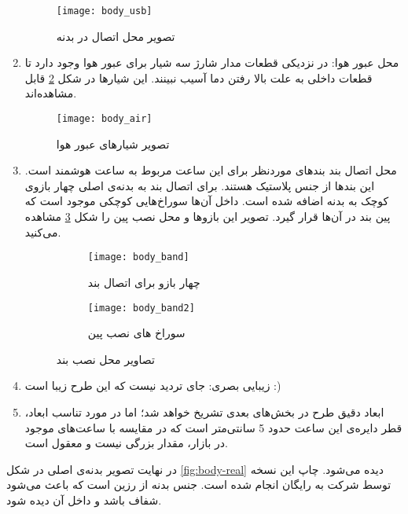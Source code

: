 \begin{enumerate}
	\begin{figure}[h]
		\centering
		\texttt{[image: body\_usb]}
		\caption{تصویر محل اتصال  در بدنه}
		\label{fig:body-usb}
	\end{figure}
	
	\item محل عبور هوا:
	در نزدیکی قطعات مدار شارژ سه شیار برای عبور هوا وجود دارد تا قطعات داخلی به علت بالا رفتن دما آسیب نبینند. این شیارها در شکل \ref{fig:body-air} قابل مشاهده‌اند.
	
	\begin{figure}[h]
		\centering
		\texttt{[image: body\_air]}
		\caption{تصویر شیارهای عبور هوا}
		\label{fig:body-air}
	\end{figure}

	\item محل اتصال بند
	بندهای موردنظر برای این ساعت مربوط به ساعت هوشمند  است. این بندها از جنس پلاستیک هستند. برای اتصال بند به بدنه‌ی اصلی چهار بازوی کوچک به بدنه اضافه شده است. داخل آن‌ها سوراخ‌هایی کوچکی موجود است که پین بند در آن‌ها قرار گیرد. تصویر این بازوها و محل نصب پین را شکل \ref{fig:body-band} مشاهده می‌کنید.
	
	\begin{figure}[h]
		\centering
		\begin{subfigure}{0.4\textwidth}
			\centering
			\texttt{[image: body\_band]}
			\caption{چهار بازو برای اتصال بند}
		\end{subfigure}
		\begin{subfigure}{0.3\textwidth}
			\centering
			\texttt{[image: body\_band2]}
			\caption{سوراخ های نصب پین}
		\end{subfigure}
		\caption{تصاویر محل نصب بند}
		\label{fig:body-band}
	\end{figure}

	\item زیبایی بصری: جای تردید نیست که این طرح زیبا است :)
	\item ابعاد دقیق طرح در بخش‌های بعدی تشریخ خواهد شد؛ اما در مورد تناسب ابعاد، قطر دایره‌ی این ساعت حدود 5 سانتی‌متر است که در مقایسه با ساعت‌های موجود در بازار، مقدار بزرگی نیست و معقول است.
\end{enumerate}

در نهایت تصویر بدنه‌ی اصلی در شکل \ref{fig:body-real} دیده می‌شود. چاپ این نسخه توسط شرکت \cite{PCBWay} به رایگان انجام شده است. جنس بدنه از رزین است که باعث می‌شود شفاف باشد و داخل آن دیده شود.

